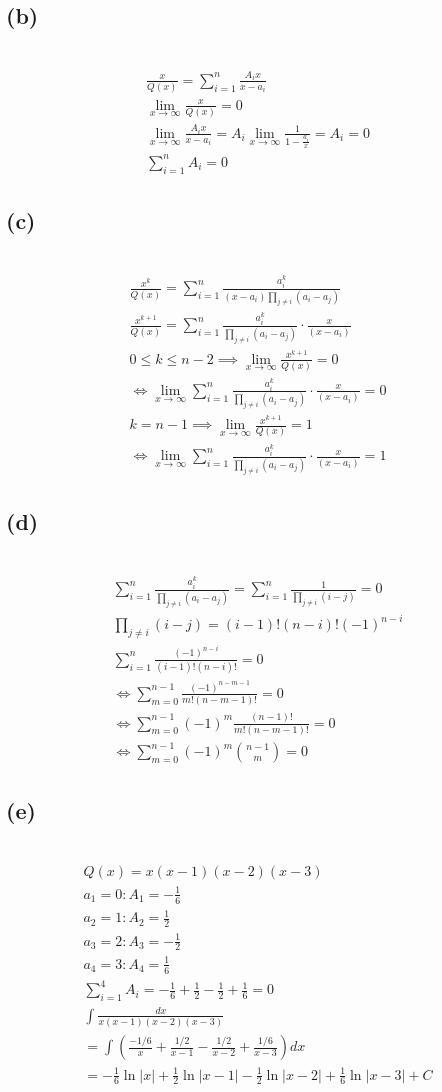 \documentclass[12pt]{article}
\newcommand{\subproblem}[1]{\subsection{(#1)} \,}
\begin{document}
\subproblem{b}
\begin{gather*}
    \frac{x}{Q(x)} =  \sum_{i=1}^n \frac{A_ix}{x-a_i}\\
    \lim_{x\to \infty} \frac{x}{Q(x)}=0\\
    \lim_{x\to \infty}\frac{A_ix}{x-a_i} = A_i\lim_{x\to \infty}\frac{1}{1-\frac{a_i}{x}} = A_i = 0\\
    \boxed{\sum_{i=1}^n A_i = 0}
\end{gather*}

\subproblem{c}
\begin{gather*}
    \frac{x^k}{Q(x)} =  \sum_{i=1}^n \frac{a_i^k}{(x-a_i) \prod_{j \ne i} (a_i-a_j) }\\
    \frac{x^{k+1}}{Q(x)} =  \sum_{i=1}^n \frac{a_i^k}{ \prod_{j \ne i} (a_i-a_j) }  \cdot \frac{x}{(x-a_i)}\\
    0 \le k \le n-2 \implies \lim_{x \to \infty} \frac{x^{k+1}}{Q(x)} = 0\\
    \iff \lim_{x \to \infty} \sum_{i=1}^n \frac{a_i^k}{ \prod_{j \ne i} (a_i-a_j) }  \cdot \frac{x}{(x-a_i)} = 0\\
    k=n-1 \implies \lim_{x \to \infty} \frac{x^{k+1}}{Q(x)} = 1\\
    \iff \lim_{x \to \infty} \sum_{i=1}^n \frac{a_i^k}{ \prod_{j \ne i} (a_i-a_j) }  \cdot \frac{x}{(x-a_i)} = 1
\end{gather*}

\subproblem{d}
\begin{gather*}
    \sum_{i=1}^n \frac{a_i^k}{ \prod_{j \ne i} (a_i-a_j) } = \sum_{i=1}^n \frac{1}{ \prod_{j \ne i} (i-j) }=0 \\
    \prod_{j \ne i} (i-j) = (i-1)!(n-i)!(-1)^{n-i}\\
    \sum_{i=1}^n \frac{(-1)^{n-i}}{ (i-1)!(n-i)! } = 0\\
    \iff \sum_{m=0}^{n-1} \frac{(-1)^{n-m-1}}{ m!(n-m-1)! } = 0\\
    \iff \sum_{m=0}^{n-1} (-1)^{m}\frac{(n-1)!}{ m!(n-m-1)! } = 0\\
    \iff \boxed{\sum_{m=0}^{n-1} (-1)^{m} \binom{n - 1}{m} = 0}
\end{gather*}

\subproblem{e}
\begin{gather*}
    Q(x)=x(x-1)(x-2)(x-3)\\
    a_1=0:A_1= -\frac{1}{6}\\
    a_2=1:A_2= \frac{1}{2}\\
    a_3=2: A_3=-\frac{1}{2}\\
    a_4=3: A_4= \frac{1}{6}\\
    \sum_{i=1}^4 A_i = -\frac{1}{6} + \frac{1}{2} - \frac{1}{2} + \frac{1}{6} = 0\\
    \int \frac{dx}{x(x-1)(x-2)(x-3)}\\
     = \int \left( \frac{-1/6}{x} + \frac{1/2}{x-1} - \frac{1/2}{x-2} + \frac{1/6}{x-3} \right) dx \\
     = \boxed{-\frac{1}{6} \ln\vert{}x\vert{} + \frac{1}{2} \ln\vert{}x-1\vert{} - \frac{1}{2} \ln\vert{}x-2\vert{} + \frac{1}{6} \ln\vert{}x-3\vert{} + C}
\end{gather*}
\end{document}
